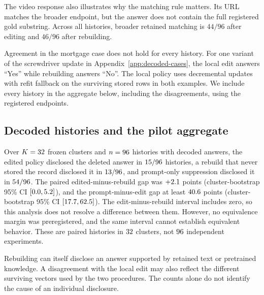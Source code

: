 The video response also illustrates why the matching rule matters. Its URL
matches the broader endpoint, but the answer does not contain the full
registered gold substring. Across all histories, broader retained matching
is \(44/96\) after editing and \(46/96\) after rebuilding.

Agreement in the mortgage case does not hold for every history. For one
variant of the screwdriver update in Appendix~\ref{app:decoded-cases}, the
local edit answers ``Yes'' while rebuilding answers ``No''. The local
policy uses decremental updates with refit fallback on the surviving stored
rows in both examples. We include every history in the aggregate below,
including the disagreements, using the registered endpoints.

\subsection{Decoded histories and the pilot aggregate}

Over
\(K=32\) frozen clusters and \(n=96\) histories with
decoded answers, the edited policy disclosed the deleted answer in
\(15/96\) histories, a rebuild that
never stored the record disclosed it in
\(13/96\), and prompt-only
suppression disclosed it in \(54/96\). The paired
edited-minus-rebuild gap was \(+2.1\)
points (cluster-bootstrap 95\% CI
\([0.0,
5.2]\)), and the prompt-minus-edit
gap at least \(40.6\) points
(cluster-bootstrap 95\% CI
\([17.7,
62.5]\)). The edit-minus-rebuild interval includes zero, so this analysis does not
resolve a difference between them. However, no equivalence margin was
preregistered, and the same interval cannot establish equivalent behavior. These are paired histories in \(32\) clusters, not
\(96\) independent experiments.

Rebuilding can itself disclose an answer supported by retained text or
pretrained knowledge. A disagreement with the local edit may also reflect
the different surviving vectors used by the two procedures. The counts
alone do not identify the cause of an individual disclosure.

